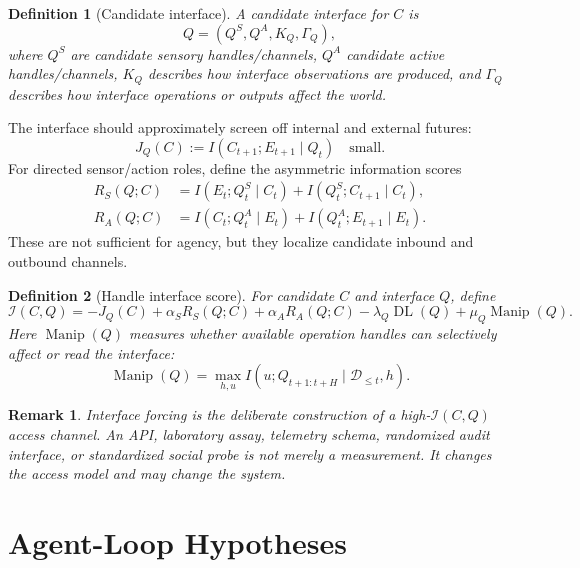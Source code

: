 \documentclass[11pt]{article}
\newtheorem{definition}{Definition}
\newtheorem{remark}{Remark}
\newcommand{\D}{\mathcal D}
\newcommand{\MI}{I}
\newcommand{\DL}{\operatorname{DL}}
\begin{document}
\begin{definition}[Candidate interface]
A candidate interface for $C$ is
\[
    Q=(Q^S,Q^A,K_Q,\Gamma_Q),
\]
where $Q^S$ are candidate sensory handles/channels, $Q^A$ candidate active
handles/channels, $K_Q$ describes how interface observations are produced, and
$\Gamma_Q$ describes how interface operations or outputs affect the world.
\end{definition}

The interface should approximately screen off internal and external futures:
\begin{equation}
    J_Q(C)
    :=
    \MI(C_{t+1};E_{t+1}\mid Q_t)
    \quad\text{small}.
    \label{eq:interface-screening}
\end{equation}
For directed sensor/action roles, define the asymmetric information scores
\begin{align}
    R_S(Q;C)
    &=
    \MI(E_t;Q^S_t\mid C_t)
    +
    \MI(Q^S_t;C_{t+1}\mid C_t),
    \\
    R_A(Q;C)
    &=
    \MI(C_t;Q^A_t\mid E_t)
    +
    \MI(Q^A_t;E_{t+1}\mid E_t).
\end{align}
These are not sufficient for agency, but they localize candidate inbound and
outbound channels.

\begin{definition}[Handle interface score]
For candidate $C$ and interface $Q$, define
\begin{equation}
    \mathcal I(C,Q)
    =
    -J_Q(C)
    +\alpha_S R_S(Q;C)
    +\alpha_A R_A(Q;C)
    -\lambda_Q \DL(Q)
    +\mu_Q \operatorname{Manip}(Q).
    \label{eq:interface-score}
\end{equation}
Here $\operatorname{Manip}(Q)$ measures whether available operation handles can
selectively affect or read the interface:
\[
    \operatorname{Manip}(Q)
    =
    \max_{h,u}
    \MI(u;Q_{t+1:t+H}\mid \D_{\le t},h).
\]
\end{definition}

\begin{remark}
Interface forcing is the deliberate construction of a high-$\mathcal I(C,Q)$
access channel. An API, laboratory assay, telemetry schema, randomized audit
interface, or standardized social probe is not merely a measurement. It changes
the access model and may change the system.
\end{remark}

\section{Agent-Loop Hypotheses}
\end{document}
